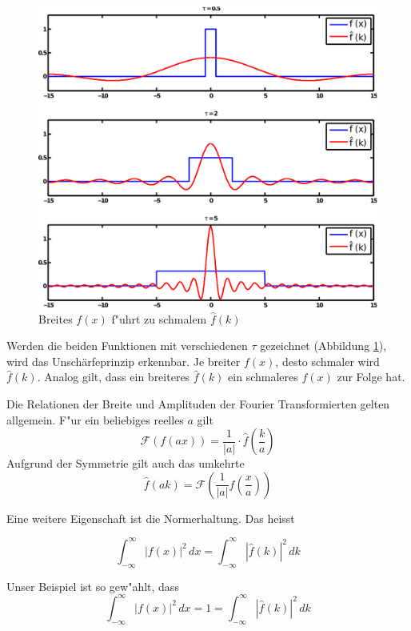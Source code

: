 \begin{refsection}
\begin{figure}
 \centering
 \includegraphics[width=12cm]{heisenberg/fourier_unschaerfeprinzip.pdf}
 \caption{Breites $f(x)$ f"uhrt zu schmalem $\hat{f}(k)$}
 \label{abb:unschaerfeprinzip}
\end{figure}

Werden die beiden Funktionen mit verschiedenen $\tau$ gezeichnet (Abbildung \ref{abb:unschaerfeprinzip}), wird das Unsch\"arfeprinzip erkennbar. Je breiter $f(x)$, desto schmaler wird $\hat{f}(k)$. Analog gilt, dass ein breiteres $\hat{f}(k)$ ein schmaleres $f(x)$ zur Folge hat.

Die Relationen der Breite und Amplituden der Fourier Transformierten gelten allgemein. F"ur ein beliebiges reelles $a$ gilt
\begin{equation}
\mathcal{F}(f(ax)) = \frac{1}{|a|}\cdot\hat{f}\left( \frac{k}{a}\right) 
\end{equation}
Aufgrund der Symmetrie gilt auch das umkehrte
\begin{equation}
\hat{f}(ak) = \mathcal{F}\left( \frac{1}{|a|}f\left( \frac{x}{a}\right) \right) 
\end{equation}

Eine weitere Eigenschaft ist die Normerhaltung. Das heisst

\begin{equation}
\int_{-\infty}^{\infty}|f(x)|^{2} \, dx = \int_{-\infty}^{\infty}|\hat{f}(k)|^{2} \, dk
\end{equation}

Unser Beispiel ist so gew"ahlt, dass
\begin{equation}
\int_{-\infty}^{\infty}|f(x)|^{2} \, dx = 1 = \int_{-\infty}^{\infty}|\hat{f}(k)|^{2} \, dk
\end{equation}


\end{refsection}
